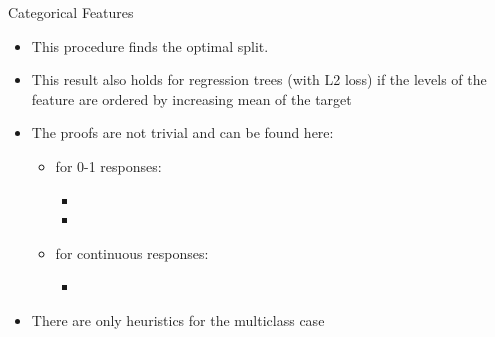 \documentclass[11pt,compress,t,notes=noshow, xcolor=table]{beamer}
\begin{document}
\begin{framev}{Categorical Features}

  \begin{itemize}
  \item This procedure finds the optimal split.
  \item This result also holds for regression trees (with L2 loss) if the levels of the feature are ordered by increasing mean of the target
  \item The proofs are not trivial and can be found here:
    \begin{itemize}
    \item for 0-1 responses:
      \begin{itemize}
      \item {}
      \item  {}
      \end{itemize}
    \item for continuous responses:
      \begin{itemize}
      \item {}
      \end{itemize}
    \end{itemize}
  \item There are only heuristics for the multiclass case 
  \end{itemize}

\end{framev}
\end{document}

